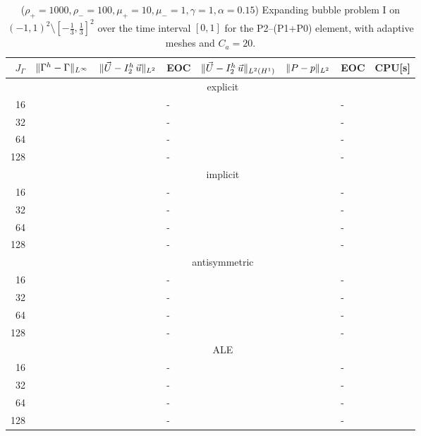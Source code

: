 \begin{table}
\center
\hspace*{-3.25cm}
\begin{tabular}{rllllllr}
\hline
$J_\Gamma$ & $\|\Gamma^h - \Gamma\|_{L^\infty}$ & $\|\vec U - I^h_{2}\,\vec u\|_{L^2}$ & EOC & $\|\vec U - I^h_{2}\,\vec u\|_{L^2(H^1)}$ & $\|P - p\|_{L^2}$ & EOC
& CPU[s] \\
\hline
& \multicolumn{7}{c}{explicit} \\
\hline
 16 & & & - & & & - & \\
 32 & & & - & & & - & \\
 64 & & & - & & & - & \\
128 & & & - & & & - & \\
\hline
& \multicolumn{7}{c}{implicit} \\
\hline
 16 & & & - & & & - & \\
 32 & & & - & & & - & \\
 64 & & & - & & & - & \\
128 & & & - & & & - & \\
\hline
& \multicolumn{7}{c}{antisymmetric} \\
\hline
 16 & & & - & & & - & \\
 32 & & & - & & & - & \\
 64 & & & - & & & - & \\
128 & & & - & & & - & \\
\hline
& \multicolumn{7}{c}{ALE} \\
\hline
 16 & & & - & & & - & \\
 32 & & & - & & & - & \\
 64 & & & - & & & - & \\
128 & & & - & & & - & \\
\hline
\end{tabular}
\hspace*{-3.25cm}
\caption[Navier--Stokes expanding bubble I errors P2--(P1+P0)]
{($\rho_+ = 1000,\rho_- = 100,\mu_+ = 10,\mu_- =1,\gamma = 1,\alpha=0.15$)
Expanding bubble problem I on $(-1,1)^2\setminus[-\frac{1}{3},\frac{1}{3}]^2$
over the time interval $[0,1]$ for the P2--(P1+P0) element, with adaptive
meshes and $C_a=20$\textdegree.}
\label{tab:nsexpandingbubbleIp2p1p0}
\end{table}

